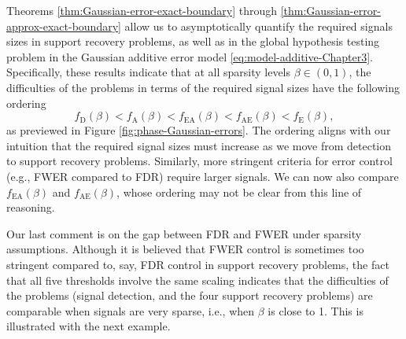  
Theorems \ref{thm:Gaussian-error-exact-boundary} through \ref{thm:Gaussian-error-approx-exact-boundary} allow us to asymptotically quantify the required signals sizes in support recovery problems, as well as in the global hypothesis testing problem in the Gaussian additive error model \eqref{eq:model-additive-Chapter3}. 
Specifically, these results indicate that at all sparsity levels $\beta\in(0,1)$, the difficulties of the problems in terms of the required signal sizes have the following ordering
$$
f_{\mathrm{D}}(\beta) < f_{\mathrm{A}}(\beta) < f_{\mathrm{EA}}(\beta) < f_{\mathrm{AE}}(\beta) < f_{\mathrm{E}}(\beta),
$$
as previewed in Figure \ref{fig:phase-Gaussian-errors}.
The ordering aligns with our intuition that the required signal sizes must increase as we move from detection to support recovery problems.
Similarly, more stringent criteria for error control (e.g., FWER compared to FDR) require larger signals.
We can now also compare $f_{\mathrm{EA}}(\beta)$ and $f_{\mathrm{AE}}(\beta)$, whose ordering may not be clear from this line of reasoning.


\medskip

Our last comment is on the gap between FDR and FWER under sparsity assumptions. 
Although it is believed that FWER control is sometimes too stringent compared to, say, FDR control in support recovery problems, the fact that all five thresholds involve the same scaling indicates that the difficulties of the problems (signal detection, and the four support recovery problems) are comparable when signals are very sparse, i.e., when $\beta$ is close to 1.
This is illustrated with the next example.

